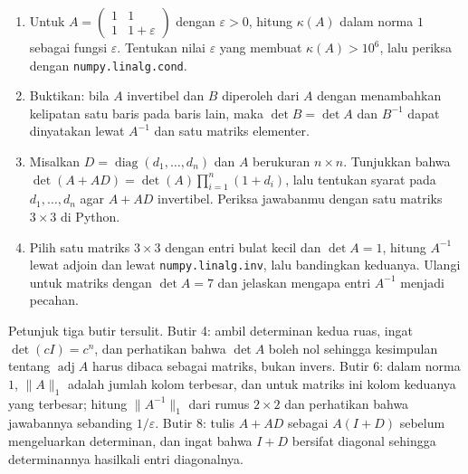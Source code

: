 \begin{latihan}
\begin{enumerate}
  \item Untuk $A=\begin{pmatrix}1&1\\ 1&1+\varepsilon\end{pmatrix}$ dengan
        $\varepsilon>0$, hitung $\kappa(A)$ dalam norma $1$ sebagai fungsi
        $\varepsilon$. Tentukan nilai $\varepsilon$ yang membuat $\kappa(A)>10^{6}$, lalu
        periksa dengan \texttt{numpy.linalg.cond}.

  \item Buktikan: bila $A$ invertibel dan $B$ diperoleh dari $A$ dengan menambahkan
        kelipatan satu baris pada baris lain, maka $\det B=\det A$ dan
        $B^{-1}$ dapat dinyatakan lewat $A^{-1}$ dan satu matriks elementer.

  \item Misalkan $D=\operatorname{diag}(d_{1},\dots,d_{n})$ dan $A$ berukuran $n\times n$.
        Tunjukkan bahwa $\det(A+AD)=\det(A)\prod_{i=1}^{n}(1+d_{i})$, lalu tentukan syarat
        pada $d_{1},\dots,d_{n}$ agar $A+AD$ invertibel. Periksa jawabanmu dengan satu
        matriks $3\times3$ di Python.

  \item Pilih satu matriks $3\times3$ dengan entri bulat kecil dan $\det A=1$, hitung
        $A^{-1}$ lewat adjoin dan lewat \texttt{numpy.linalg.inv}, lalu bandingkan
        keduanya. Ulangi untuk matriks dengan $\det A=7$ dan jelaskan mengapa entri
        $A^{-1}$ menjadi pecahan.
\end{enumerate}

Petunjuk tiga butir tersulit. Butir 4: ambil determinan kedua ruas, ingat
$\det(cI)=c^{n}$, dan perhatikan bahwa $\det A$ boleh nol sehingga kesimpulan tentang
$\operatorname{adj}A$ harus dibaca sebagai matriks, bukan invers. Butir 6: dalam norma $1$,
$\lVert A\rVert_{1}$ adalah jumlah kolom terbesar, dan untuk matriks ini kolom keduanya
yang terbesar; hitung $\lVert A^{-1}\rVert_{1}$ dari rumus $2\times2$ dan perhatikan bahwa
jawabannya sebanding $1/\varepsilon$. Butir 8: tulis $A+AD$ sebagai $A(I+D)$ sebelum
mengeluarkan determinan, dan ingat bahwa $I+D$ bersifat diagonal sehingga determinannya
hasilkali entri diagonalnya.
\end{latihan}

